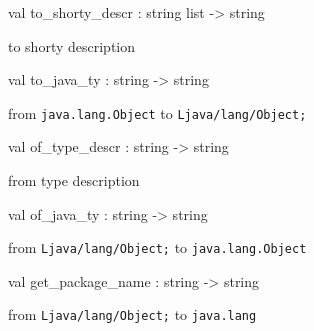 \documentclass[11pt]{article}
\begin{document}
\label{val:Java.to-underscoreshorty-underscoredescr}\begin{ocamldoccode}
val to_shorty_descr : string list -> string
\end{ocamldoccode}
\begin{ocamldocdescription}
to shorty description


\end{ocamldocdescription}




\label{val:Java.to-underscorejava-underscorety}\begin{ocamldoccode}
val to_java_ty : string -> string
\end{ocamldoccode}
\begin{ocamldocdescription}
from {\tt{java.lang.Object}} to {\tt{Ljava/lang/Object;}}


\end{ocamldocdescription}




\label{val:Java.of-underscoretype-underscoredescr}\begin{ocamldoccode}
val of_type_descr : string -> string
\end{ocamldoccode}
\begin{ocamldocdescription}
from type description


\end{ocamldocdescription}




\label{val:Java.of-underscorejava-underscorety}\begin{ocamldoccode}
val of_java_ty : string -> string
\end{ocamldoccode}
\begin{ocamldocdescription}
from {\tt{Ljava/lang/Object;}} to {\tt{java.lang.Object}}


\end{ocamldocdescription}




\label{val:Java.get-underscorepackage-underscorename}\begin{ocamldoccode}
val get_package_name : string -> string
\end{ocamldoccode}
\begin{ocamldocdescription}
from {\tt{Ljava/lang/Object;}} to {\tt{java.lang}}


\end{ocamldocdescription}
\end{document}
